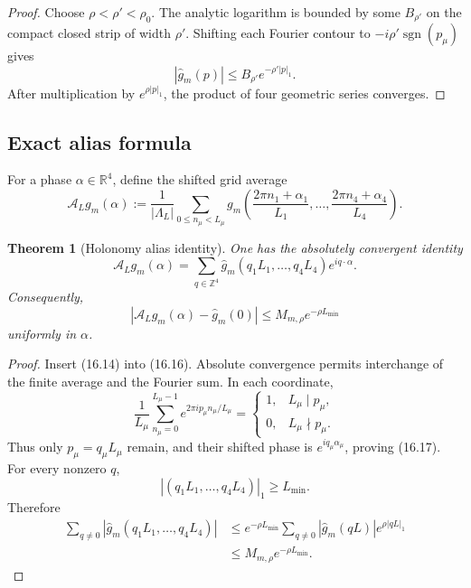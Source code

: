 \documentclass[11pt]{article}
\newtheorem{theorem}{Theorem}[section]
\newcommand{\sgn}{\operatorname{sgn}}
\begin{document}
\begin{proof}
Choose \(\rho<\rho'<\rho_0\).  The analytic logarithm is bounded by some
\(B_{\rho'}\) on the compact closed strip of width \(\rho'\).
Shifting each Fourier contour to
\(-i\rho'\sgn(p_\mu)\) gives
\[
 |\widehat g_m(p)|\leq B_{\rho'}e^{-\rho'|p|_1}.
\]
After multiplication by \(e^{\rho|p|_1}\), the product of four geometric
series converges.
\end{proof}

\subsection{Exact alias formula}

For a phase \(\alpha\in\mathbb R^4\), define the shifted grid average
\[
 \mathcal A_Lg_m(\alpha)
 :=
 \frac1{|\Lambda_L|}
 \sum_{0\leq n_\mu<L_\mu}
 g_m\left(
 \frac{2\pi n_1+\alpha_1}{L_1},\ldots,
 \frac{2\pi n_4+\alpha_4}{L_4}
 \right).
 \tag{16.16}
\]

\begin{theorem}[Holonomy alias identity]
\label{thm:v11v16-alias}
One has the absolutely convergent identity
\[
 \mathcal A_Lg_m(\alpha)
 =
 \sum_{q\in\mathbb Z^4}
 \widehat g_m(q_1L_1,\ldots,q_4L_4)e^{iq\cdot\alpha}.
 \tag{16.17}
\]
Consequently,
\[
 \left|
 \mathcal A_Lg_m(\alpha)-\widehat g_m(0)
 \right|
 \leq
 M_{m,\rho}e^{-\rho L_{\min}}
 \tag{16.18}
\]
uniformly in \(\alpha\).
\end{theorem}

\begin{proof}
Insert (16.14) into (16.16).  Absolute convergence permits interchange of
the finite average and the Fourier sum.  In each coordinate,
\[
 \frac1{L_\mu}\sum_{n_\mu=0}^{L_\mu-1}
 e^{2\pi i p_\mu n_\mu/L_\mu}
 =
 \begin{cases}
 1,&L_\mu\mid p_\mu,\\
 0,&L_\mu\nmid p_\mu.
 \end{cases}
\]
Thus only \(p_\mu=q_\mu L_\mu\) remain, and their shifted phase is
\(e^{iq_\mu\alpha_\mu}\), proving (16.17).  For every nonzero \(q\),
\[
 |(q_1L_1,\ldots,q_4L_4)|_1\geq L_{\min}.
\]
Therefore
\[
\begin{split}
 \sum_{q\ne0}
 |\widehat g_m(q_1L_1,\ldots,q_4L_4)|
 &\leq
 e^{-\rho L_{\min}}
 \sum_{q\ne0}
 |\widehat g_m(qL)|e^{\rho|qL|_1}\\
 &\leq M_{m,\rho}e^{-\rho L_{\min}}.
\end{split}
\]
\end{proof}
\end{document}
